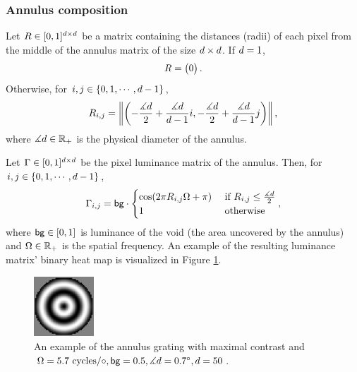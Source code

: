 \subsubsection{Annulus composition}
\label{sec:annulus-composition}

Let $R \in [0, 1]^{d \times d}$ be a matrix containing the distances (radii) of each pixel from the middle of the annulus matrix of the size $d \times d$. If $d = 1$,
\begin{equation}
    R = 
    \begin{pmatrix}
        0
    \end{pmatrix}.
\end{equation}
Otherwise, for $i, j \in \{ 0, 1, \cdots,  d-1 \}$,
\begin{equation}
    R_{i, j} = \left\| 
        \left(
            -\frac{\measuredangle d}{2} + \frac{\measuredangle d}{d - 1} i, 
            -\frac{\measuredangle d}{2} + \frac{\measuredangle d}{d - 1} j 
        \right) 
    \right\|,
\end{equation}
where $\measuredangle d \in \mathbb{R}_+$ is the physical diameter of the annulus.

Let $\Gamma \in [0, 1]^{d \times d}$ be the pixel luminance matrix of the annulus. Then, for $i, j \in \{ 0, 1, \cdots,  d-1 \}$,
\begin{equation}
    \Gamma_{i, j} = \mathsf{bg} \cdot
    \begin{cases}
        \cos(2 \pi R_{i, j} \Omega + \pi) 
        &\text{ if } R_{i, j} \leq \frac{\measuredangle d}{2} \\
        1 
        &\text{ otherwise}
    \end{cases},
    \label{eq:grating}
\end{equation}
where $\mathsf{bg} \in [0, 1]$ is luminance of the void (the area uncovered by the annulus) and $\Omega \in \mathbb{R}_+$ is the spatial frequency.
An example of the resulting luminance matrix' binary heat map is visualized in Figure \ref{fig:grating-example}.

\begin{figure}[!htp]
    \centering
    \includegraphics[width=0.2\textwidth]{assets/images/grating.png}
    \caption[Grating annulus]{An example of the annulus grating with maximal contrast and $\Omega = 5.7 \text{ cycles}/\circ, \mathsf{bg} = 0.5, \measuredangle d = 0.7^\circ, d = 50$.}
    \label{fig:grating-example}
\end{figure}